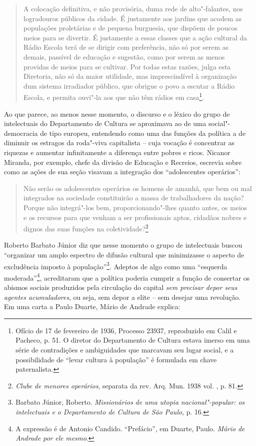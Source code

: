 \begin{quote}
A colocação definitiva, e não provisória, duma rede de alto"-falantes,
nos logradouros públicos da cidade. É justamente aos jardins que acodem
as populações proletárias e de pequena burguesia, que dispõem de poucos
meios para se divertir. É justamente a essas classes que a ação cultural
da Rádio Escola terá de se dirigir com preferência, não só por serem as
demais, passível de educação e sugestão, como por serem as menos
providas de meios para se cultivar. Por todas estas razões, julga esta
Diretoria, não só da maior utilidade, mas imprescindível à organização
dum sistema irradiador público, que obrigue o povo a escutar a Rádio
Escola, e permita ouvi"-la aos que não têm rádios em casa\footnote{Ofício
  de 17 de fevereiro de 1936, Processo 23937, reproduzido em Calil e
  Pacheco, p. 51. O diretor do Departamento de Cultura estava imerso em
  uma série de contradições e ambiguidades que marcavam seu lugar
  social, e a possibilidade de ``levar cultura à população'' é formulada
  em chave paternalista.}.
\end{quote}

Ao que parece, ao menos nesse momento, o discurso e o léxico do grupo de
intelectuais do Departamento de Cultura se aproximava ao de uma
social"-democracia de tipo europeu, entendendo como uma das funções da
política a de diminuir os estragos da roda"-viva capitalista -- cuja
vocação é concentrar as riquezas e aumentar infinitamente a diferença
entre pobres e ricos. Nicanor Miranda, por exemplo, chefe da divisão de
Educação e Recreios, escrevia sobre como as ações de sua seção visavam a
integração dos ``adolescentes operários'':

\begin{quote}
Não serão os adolescentes operários os homens de amanhã, que bem ou mal
integrados na sociedade constituirão a massa de trabalhadores da nação?
Porque não integrá"-los bem, proporcionando"-lhes quanto antes, os meios e
os recursos para que venham a ser profissionais aptos, cidadãos nobres e
dignos das suas funções na coletividade?\footnote{\emph{Clube de menores
  operários}, separata da rev. Arq. Mun. 1938 vol. , p. 81.}
\end{quote}

Roberto Barbato Júnior diz que nesse momento o grupo de intelectuais
buscou ``organizar um amplo espectro de difusão cultural que minimizasse
o aspecto de excludência imposto à população''\footnote{Barbato Júnior,
  Roberto. \emph{Missionários de uma utopia nacional"-popular: os
  intelectuais e o Departamento de Cultura de São Paulo,} p. 16.}.
Adeptos de algo como uma ``esquerda moderada''\footnote{A expressão é de
  Antonio Candido. ``Prefácio'', em Duarte, Paulo. \emph{Mário de
  Andrade por ele mesmo}.}, acreditaram que a política poderia cumprir a
função de consertar os abismos sociais produzidos pela circulação do
capital \emph{sem precisar depor seus agentes acumuladores}, ou seja,
sem depor a elite -- sem desejar uma revolução. Em uma carta a Paulo
Duarte, Mário de Andrade explica:

